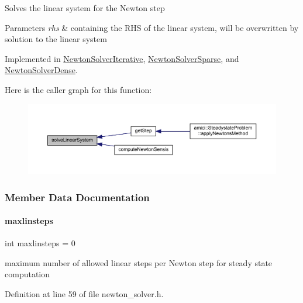 Solves the linear system for the Newton step


\begin{DoxyParams}{Parameters}
{\em rhs} & containing the R\+HS of the linear system, will be overwritten by solution to the linear system \\
\hline
\end{DoxyParams}


Implemented in \mbox{\hyperlink{classamici_1_1_newton_solver_iterative_aced8bda2d8b3051a8632152cb1f7da4a}{Newton\+Solver\+Iterative}}, \mbox{\hyperlink{classamici_1_1_newton_solver_sparse_aa4a6695d71f00ec1b46e94b33e55660f}{Newton\+Solver\+Sparse}}, and \mbox{\hyperlink{classamici_1_1_newton_solver_dense_aa4a6695d71f00ec1b46e94b33e55660f}{Newton\+Solver\+Dense}}.

Here is the caller graph for this function\+:
\nopagebreak
\begin{figure}[H]
\begin{center}
\leavevmode
\includegraphics[width=350pt]{classamici_1_1_newton_solver_a761a5dc9e8cc7adfd4a392421df17c3d_icgraph}
\end{center}
\end{figure}


\subsubsection{Member Data Documentation}
\mbox{\label{classamici_1_1_newton_solver_a60fddefccade5b1c083c6803c4c49707}} 
\paragraph{\texorpdfstring{maxlinsteps}{maxlinsteps}}
{\footnotesize\ttfamily int maxlinsteps = 0}

maximum number of allowed linear steps per Newton step for steady state computation 

Definition at line 59 of file newton\+\_\+solver.\+h.

